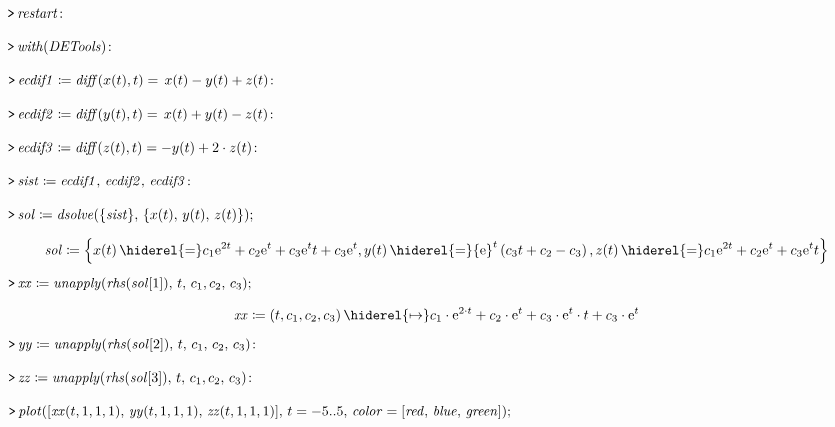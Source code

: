 \documentclass{article}
\begin{document}
{}
\mapleinput
{$ \displaystyle \texttt{>\,} \mathit{restart} \colon  $}

\mapleinput
{$ \displaystyle \texttt{>\,} \mathit{with} (\mathit{DETools})\colon  $}

\mapleinput
{$ \displaystyle \texttt{>\,} \mathit{ecdif1} \coloneqq \mathit{diff} (x (t),t)=\,x (t)-y (t)+z (t)\colon  $}

\mapleinput
{$ \displaystyle \texttt{>\,} \mathit{ecdif2} \coloneqq \mathit{diff} (y (t),t)=\,x (t)+y (t)-z (t)\colon  $}

\mapleinput
{$ \displaystyle \texttt{>\,} \mathit{ecdif3} \coloneqq \mathit{diff} (z (t),t)=-y (t)+2\cdot z (t)\colon  $}

\mapleinput
{$ \displaystyle \texttt{>\,} \mathit{sist} \coloneqq \mathit{ecdif1} ,\,\mathit{ecdif2} ,\,\mathit{ecdif3} \colon  $}

\mapleinput
{$ \displaystyle \texttt{>\,} \mathit{sol} \coloneqq \mathit{dsolve} (\{\mathit{sist} \},\,\{x (t),\,y (t),\,z (t)\}); $}

\begin{dmath}\label{(16)}
\mathit{sol} \coloneqq \left\{x \! \left(t \right) \hiderel{=} c_{1} {\mathrm e}^{2 t}+c_{2} {\mathrm e}^{t}+c_{3} {\mathrm e}^{t} t +c_{3} {\mathrm e}^{t},y \! \left(t \right) \hiderel{=} {\mathrm e}^{t} \left(c_{3} t +c_{2}-c_{3}\right),
\\
z \! \left(t \right)\hiderel{=}c_{1} {\mathrm e}^{2 t}+c_{2} {\mathrm e}^{t}+c_{3} {\mathrm e}^{t} t \right\}
\end{dmath}
\mapleinput
{$ \displaystyle \texttt{>\,} \mathit{xx} \coloneqq \mathit{unapply} (\mathit{rhs} (\mathit{sol} [1]),\,t ,\,c_{1},c_{2},\,c_{3}); $}

\begin{dmath}\label{(17)}
\mathit{xx} \coloneqq \left(t ,c_{1},c_{2},c_{3}\right)\hiderel{\mapsto }c_{1}\cdot {\mathrm e}^{2\cdot t}+c_{2}\cdot {\mathrm e}^{t}+c_{3}\cdot {\mathrm e}^{t}\cdot t +c_{3}\cdot {\mathrm e}^{t}
\end{dmath}
\mapleinput
{$ \displaystyle \texttt{>\,} \mathit{yy} \coloneqq \mathit{unapply} (\mathit{rhs} (\mathit{sol} [2]),\,t ,\,c_{1},\,c_{2},\,c_{3})\colon  $}

\mapleinput
{$ \displaystyle \texttt{>\,} \mathit{zz} \coloneqq \mathit{unapply} (\mathit{rhs} (\mathit{sol} [3]),\,t ,\,c_{1},c_{2},\,c_{3})\colon  $}

\mapleinput
{$ \displaystyle \texttt{>\,} \mathit{plot} ([\mathit{xx} (t ,1,1,1),\,\mathit{yy} (t ,1,1,1),\,\mathit{zz} (t ,1,1,1)],\,t =-5..5,\,\mathit{color} =[\mathit{red} ,\,\mathit{blue} ,\,\mathit{green}]); $}
\end{document}
